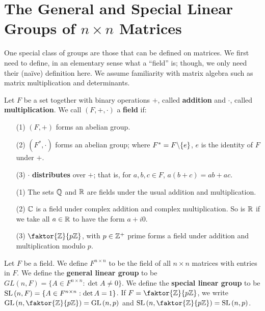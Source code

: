 \section{The General and Special Linear Groups of $n \times n$ Matrices}
\label{section_1.4}

One special class of groups are those that can be defined on matrices. We first
need to define, in an elementary sense what a ``field'' is; though, we
only need their (na\"ive) definition here. We assume familiarity with matrix
algebra such as matrix multiplication and determinants.

\begin{definition}
  Let $F$ be a set together with binary operations  $+$, called
  \textbf{addition} and $\cdot$, called  \textbf{multiplication}. We call
  $(F,+,\cdot)$ a \textbf{field} if:
  \begin{enumerate}
    \item[(1)] $(F,+)$ forms an abelian group.

    \item[(2)] $(F^*,\cdot)$ forms an abelian group; where
      $F^*=F \backslash \{e\}$, $e$ is the identity of  $F$ under  $+$.

    \item[(3)] $\cdot$  \textbf{distributes} over $+$; that is, for  $a,b,c
      \in F$,  $a(b+c)=ab+ac$.
  \end{enumerate}
\end{definition}

\begin{example}\label{example_1.9}
  \begin{enumerate}
    \item[(1)] The sets $\mathbb{Q}$ and  $\mathbb{R}$ are fields under the usual addition
      and multiplication.

    \item[(2)]  $\mathbb{C}$ is a field under complex addition and complex
      multiplication. So is  $\mathbb{R}$ if we take all $a \in \mathbb{R}$ to have the
      form  $a+i0$.

    \item[(3)] $\faktor{\Z}{p\Z}$, with $p \in \mathbb{Z}^+$ prime forms a field
      under addition and multiplication modulo $p$.
  \end{enumerate}
\end{example}

\begin{definition}
  Let $F$ be a field. We define  $F^{n \times n}$ to be the field of all $n
  \times n$ matrices with entries in $F$. We define the \textbf{general linear
  group} to be $GL(n,F)=\{A \in F^{n \times n} : \det{A} \neq 0\}$. We define
  the \textbf{special linear group} to be $\operatorname{SL}{(n,F)}=\{A \in F^{n \times n} :
  \det{A}=1\}$. If $F=\faktor{\Z}{p\Z}$, we write
  $\GL{(n,\faktor{\Z}{p\Z})}=\GL{(n,p)}$ and
  $\SL{(n,\faktor{\Z}{p\Z})}=\SL{(n,p)}$.
\end{definition}

